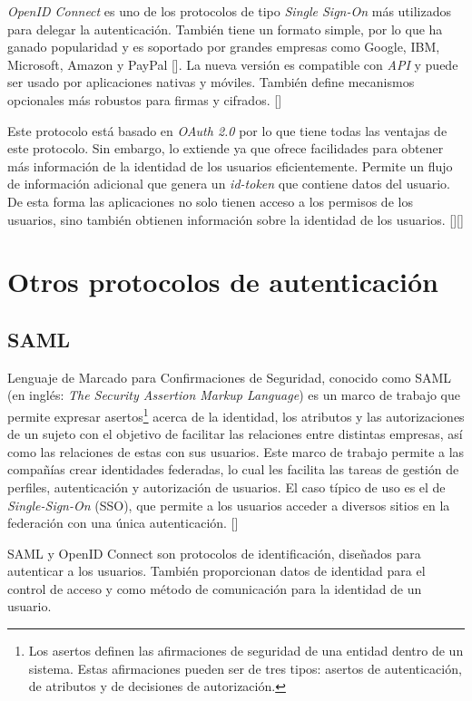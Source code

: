 \textit{OpenID Connect }es uno de los protocolos de tipo \textit{Single Sign-On} más utilizados para delegar la autenticación. También tiene un formato simple, por lo que ha ganado popularidad y es soportado por grandes empresas como Google, IBM, Microsoft, Amazon y PayPal [\cite{mainka2017sok}]. La nueva versión es compatible con \textit{API} y puede ser usado por aplicaciones nativas y móviles. También define mecanismos opcionales más robustos para firmas y cifrados. [\cite{openid-doc}]

Este protocolo está basado en \textit{OAuth 2.0} por lo que tiene todas las ventajas de este protocolo. Sin embargo, lo extiende ya que ofrece facilidades para obtener más información de la identidad de los usuarios eficientemente. Permite un flujo de información adicional que genera un \textit{id-token} que contiene datos del usuario. De esta forma las aplicaciones no solo tienen acceso a los permisos de los usuarios, sino también obtienen información sobre la identidad de los usuarios.  [\cite{openid-doc}][\cite{kutera2016single}]

\section{Otros protocolos de autenticación}
\subsection{SAML}
Lenguaje de Marcado para Confirmaciones de Seguridad, conocido como SAML (en inglés: \textit{The Security Assertion Markup Language}) es un marco de trabajo que permite expresar asertos\footnote{ Los asertos definen las afirmaciones de seguridad de una entidad dentro de un sistema. Estas afirmaciones pueden ser de tres tipos: asertos de autenticación, de atributos y de decisiones de autorización.} acerca de la identidad, los atributos y las autorizaciones de un sujeto con el objetivo de facilitar las relaciones entre distintas empresas, así como las relaciones de estas con sus usuarios. Este marco de trabajo permite a las compañías crear identidades federadas, lo cual les facilita las tareas de gestión de perfiles, autenticación y autorización de usuarios. El caso típico de uso es el de \textit{Single-Sign-On }(SSO), que permite a los usuarios acceder a diversos sitios en la federación con una única autenticación. [\cite{sanchez2009estudio}]

SAML y OpenID Connect son protocolos de identificación, diseñados para autenticar a los usuarios. También proporcionan datos de identidad para el control de acceso y como método de comunicación para la identidad de un usuario.

